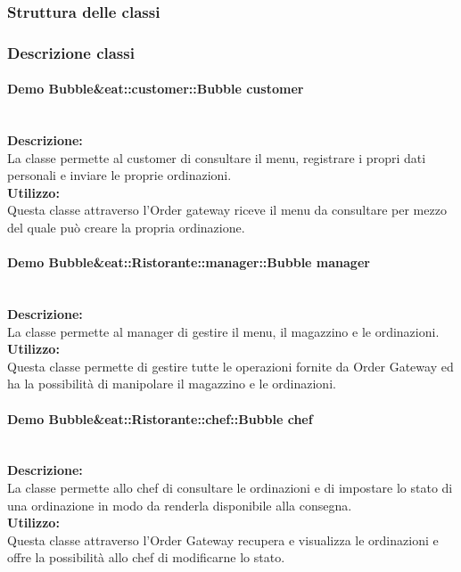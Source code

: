 \subsubsection{Struttura delle classi}

\subsubsection{Descrizione classi}

\paragraph{Demo Bubble\&eat::customer::Bubble customer}\mbox{}\\
\textbf{Descrizione:}\\
La classe permette al customer di consultare il menu, registrare i propri dati personali e inviare le proprie ordinazioni.\\
\textbf{Utilizzo:}\\
Questa classe attraverso l’Order gateway riceve il menu da consultare per mezzo del quale può creare la propria ordinazione.\\

\paragraph{Demo Bubble\&eat::Ristorante::manager::Bubble manager}\mbox{}\\
\textbf{Descrizione:}\\
La classe permette al manager di gestire il menu, il magazzino e le ordinazioni.\\
\textbf{Utilizzo:}\\
Questa classe permette di gestire tutte le operazioni fornite da Order Gateway ed ha la possibilità di manipolare il magazzino e le ordinazioni.\\

\paragraph{Demo Bubble\&eat::Ristorante::chef::Bubble chef}\mbox{}\\
\textbf{Descrizione:}\\
La classe permette allo chef di consultare le ordinazioni e di impostare lo stato di una ordinazione in modo da renderla disponibile alla consegna.\\
\textbf{Utilizzo:}\\
Questa classe attraverso l’Order Gateway recupera e visualizza le ordinazioni e offre la possibilità allo chef di modificarne lo stato.\\

